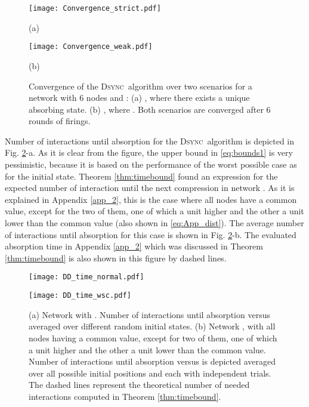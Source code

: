 \documentclass[conference]{IEEEtran}
\newcommand{\DDD}{\textsc{Dsync~}}
\theoremstyle{definition}
\theoremstyle{definition}
\begin{document}
\begin{figure}
\centering
\begin{minipage}[b]{0.48\linewidth}
\centerline{\texttt{[image: Convergence\_strict.pdf]}}
\centerline{(a)}\medskip
\hfill
\end{minipage}
\begin{minipage}[b]{0.48\linewidth}
\centerline{\texttt{[image: Convergence\_weak.pdf]}}
\centerline{(b)}\medskip
\hfill
\end{minipage}
\vspace{-0.35in}
\caption{Convergence of the \DDD algorithm over two scenarios for a network  with 6 nodes and : (a) , where there exists a unique absorbing state. (b) , where . Both scenarios are converged after 6 rounds of firings.} 
\label{fig:Convergence}
\end{figure}
Number of interactions until absorption for the \DDD algorithm is depicted in Fig. \ref{fig:time_Convergence}-a. As it is clear from the figure, the upper bound in \eqref{eq:bounds1} is very pessimistic, because it is based on the performance of the worst possible case  as for the initial state. Theorem \ref{thm:timebound} found an expression for the expected number of interaction until the next compression in network . As it is explained in Appendix \ref{app_2}, this is the case where all nodes have a common value, except for the two of them, one of which a unit higher and the other a unit lower than the common value (also shown in \eqref{eq:App_dist}). The average number of interactions until absorption for this case is shown in Fig. \ref{fig:time_Convergence}-b. The evaluated absorption time in Appendix \ref{app_2} which was discussed in Theorem \ref{thm:timebound} is also shown in this figure by dashed lines. 
\begin{figure}
\centering
\begin{minipage}[b]{0.48\linewidth}
\centerline{\texttt{[image: DD\_time\_normal.pdf]}}
\hfill
\end{minipage}
\begin{minipage}[b]{0.48\linewidth}
\centerline{\texttt{[image: DD\_time\_wsc.pdf]}}
\hfill
\end{minipage}
\vspace{-0.2in}
\caption{(a) Network  with . Number of interactions until absorption versus  averaged over  different random initial states. (b) Network , with all nodes having a common value, except for two of them, one of which a unit higher and the other a unit lower than the common value. Number of interactions until absorption versus  is depicted averaged over all possible initial positions and each with   independent trials. The dashed lines represent the theoretical number of needed interactions computed in Theorem \ref{thm:timebound}.} 
\label{fig:time_Convergence}
\end{figure}
\end{document}
